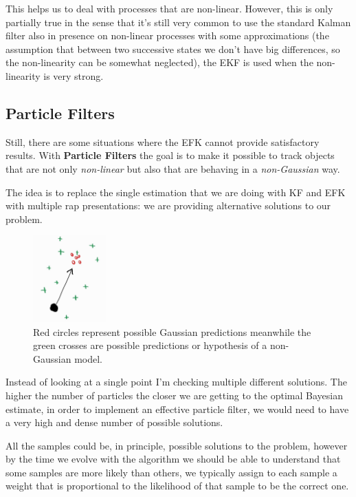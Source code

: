 This helps us to deal with processes that are non-linear. However, this is only partially true in the sense that it's still very common to use the standard Kalman filter also in presence on non-linear processes with some approximations (the assumption that between two successive states we don't have big differences, so the non-linearity can be somewhat neglected), the EKF is used when the non-linearity is very strong.

\subsection{Particle Filters} 

Still, there are some situations where the EFK cannot provide satisfactory results. With \textbf{Particle Filters} the goal is to make it possible to track objects that are not only \textit{non-linear} but also that are behaving in a \textit{non-Gaussian} way.

The idea is to replace the single estimation that we are doing with KF and EFK with multiple rap presentations: we are providing alternative solutions to our problem. 

\begin{figure}[H]
    \centering
    \includegraphics[width=0.25\textwidth]{Figures/nongaus.jpg}
    \caption{Red circles represent possible Gaussian predictions meanwhile the green crosses are possible predictions or hypothesis of a non-Gaussian model.}
    \label{img:nongaus}
\end{figure}

Instead of looking at a single point I'm checking multiple different solutions. The higher the number of particles the closer we are getting to the optimal Bayesian estimate, in order to implement an effective particle filter, we would need to have a very high and dense number of possible solutions.

All the samples could be, in principle, possible solutions to the problem, however by the time we evolve with the algorithm we should be able to understand that some samples are more likely than others, we typically assign to each sample a weight that is proportional to the likelihood of that sample to be the correct one.

